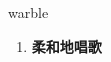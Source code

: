 
\begin{frame}
{\huge warble}
\begin{center}
\begin{enumerate}\Large
  \item \textbf{柔和地唱歌}
\end{enumerate}
\end{center}
\end{frame}
